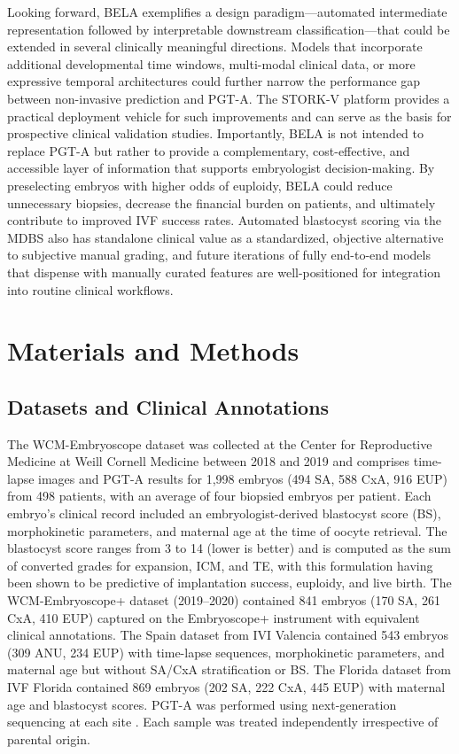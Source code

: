 \documentclass[11pt]{article}
\begin{document}
Looking forward, BELA exemplifies a design paradigm---automated intermediate representation followed by interpretable downstream classification---that could be extended in several clinically meaningful directions. Models that incorporate additional developmental time windows, multi-modal clinical data, or more expressive temporal architectures could further narrow the performance gap between non-invasive prediction and PGT-A. The STORK-V platform provides a practical deployment vehicle for such improvements and can serve as the basis for prospective clinical validation studies. Importantly, BELA is not intended to replace PGT-A but rather to provide a complementary, cost-effective, and accessible layer of information that supports embryologist decision-making. By preselecting embryos with higher odds of euploidy, BELA could reduce unnecessary biopsies, decrease the financial burden on patients, and ultimately contribute to improved IVF success rates. Automated blastocyst scoring via the MDBS also has standalone clinical value as a standardized, objective alternative to subjective manual grading, and future iterations of fully end-to-end models that dispense with manually curated features are well-positioned for integration into routine clinical workflows.


\section{Materials and Methods}

\subsection{Datasets and Clinical Annotations}

The WCM-Embryoscope dataset was collected at the Center for Reproductive Medicine at Weill Cornell Medicine between 2018 and 2019 and comprises time-lapse images and PGT-A results for 1{,}998 embryos (494 SA, 588 CxA, 916 EUP) from 498 patients, with an average of four biopsied embryos per patient. Each embryo's clinical record included an embryologist-derived blastocyst score (BS), morphokinetic parameters, and maternal age at the time of oocyte retrieval. The blastocyst score ranges from 3 to 14 (lower is better) and is computed as the sum of converted grades for expansion, ICM, and TE, with this formulation having been shown to be predictive of implantation success, euploidy, and live birth. The WCM-Embryoscope+ dataset (2019--2020) contained 841 embryos (170 SA, 261 CxA, 410 EUP) captured on the Embryoscope+ instrument with equivalent clinical annotations. The Spain dataset from IVI Valencia contained 543 embryos (309 ANU, 234 EUP) with time-lapse sequences, morphokinetic parameters, and maternal age but without SA/CxA stratification or BS. The Florida dataset from IVF Florida contained 869 embryos (202 SA, 222 CxA, 445 EUP) with maternal age and blastocyst scores. PGT-A was performed using next-generation sequencing at each site \citep{garciapascual2020ngs}. Each sample was treated independently irrespective of parental origin.
\end{document}
